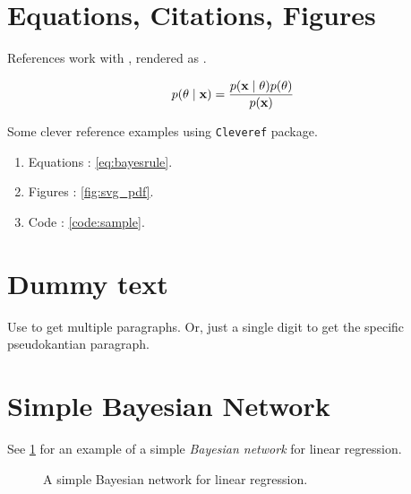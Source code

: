 \documentclass[11pt]{article}
\begin{document}
\section{Equations, Citations, Figures}

References work with , rendered as \citet{vargp2020}.

\begin{align}
p(\theta \mid {\ensuremath{\boldsymbol{\mathbf{x}}}}) = \frac{p({\boldsymbol{\mathbf{x}}}\mid\theta)p(\theta)}{p({\boldsymbol{\mathbf{x}}})} \label{eq:bayesrule}
\end{align}

Some clever reference examples using \texttt{Cleveref} package.

\begin{enumerate}
\item Equations : \cref{eq:bayesrule}.
\item Figures : \cref{fig:svg_pdf}.
\item Code : \cref{code:sample}.
\end{enumerate}

\section{Dummy text}

Use \vrb{\kant[1-3]} to get multiple paragraphs. Or, just a single digit to get the specific pseudokantian paragraph.

\kant[1-3]

\section{Simple Bayesian Network}

See \cref{fig:bayes_net} for an example of a simple \emph{Bayesian network} for linear regression.

\begin{figure}[ht]
    \centering
{}
    \caption{A simple Bayesian network for linear regression.}
    \label{fig:bayes_net}
\end{figure}
\end{document}
